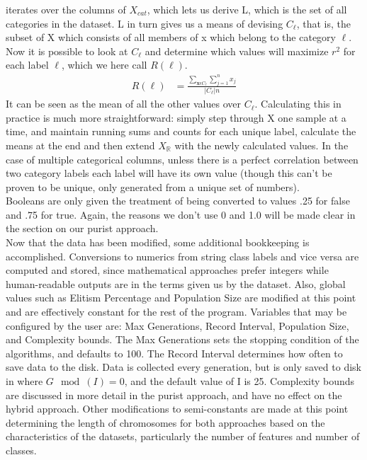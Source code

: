 iterates over the columns of $X_{cat}$, which lets us derive L, which is the set
of all categories in the dataset.  L in turn gives us a means of devising $C_\ell$,
that is, the subset of X which consists of all members of x which belong to the
category $\ell$. Now it is possible to look at $C_\ell$ and determine which values
will maximize $r^2$ for each label $\ell$, which we here call $R(\ell)$.
\begin{align}
	R(\ell) &= \frac{\sum_{\textbf{x}\epsilon C_\ell}\sum_{j=1}^{n}x_j}{|C_\ell|n}
\end{align} 
It can be seen as the mean of all the other values over $C_\ell$.  Calculating this
in practice is much more straightforward: simply step through X one sample at a
time, and maintain running sums and counts for each unique label, calculate the
means at the end and then extend $X_\mathbb{R}$ with the newly calculated
values.  In the case of multiple categorical columns, unless there is a perfect
correlation between two category labels each label will have its own value
(though this can't be proven to be unique, only generated from a unique set of
numbers).\\
Booleans are only given the treatment of being converted to values .25 for false
and .75 for true.  Again, the reasons we don't use 0 and 1.0 will be made clear
in the section on our purist approach.\\
Now that the data has been modified, some additional bookkeeping is
accomplished.  Conversions to numerics from string class labels and vice versa
are computed and stored, since mathematical approaches prefer integers while
human-readable outputs are in the terms given us by the dataset.  Also, global
values such as Elitism Percentage and Population Size are modified at this point
and are effectively constant for the rest of the program.  Variables that may be
configured by the user are: Max Generations, Record Interval, Population Size,
and Complexity bounds.  The Max Generations sets the stopping condition of the
algorithms, and defaults to 100.  The Record Interval determines how often to
save data to the disk. Data is collected every generation, but is only saved to
disk in where $G \mod(I) = 0$, and the default value of I is 25.  Complexity bounds are
discussed in more detail in the purist approach, and have no effect on the
hybrid approach.  Other modifications to semi-constants are made at this point
determining the length of chromosomes for both approaches based on the
characteristics of the datasets, particularly the number of features and number of classes.
